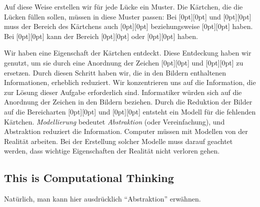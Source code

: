 \documentclass[a4paper,11pt]{report}
\newcommand{\taskGraphicsFolder}{..}
\begin{document}
Auf diese Weise erstellen wir für jede Lücke ein Muster. Die Kärtchen, die die Lücken füllen sollen, müssen in diese Muster passen: Bei \raisebox{-0.5ex}[0pt][0pt]{} und \raisebox{-0.5ex}[0pt][0pt]{} muss der Bereich des Kärtchens auch \raisebox{-0.5ex}[0pt][0pt]{} beziehungsweise \raisebox{-0.5ex}[0pt][0pt]{} haben. Bei \raisebox{-0.5ex}[0pt][0pt]{} kann der Bereich \raisebox{-0.5ex}[0pt][0pt]{} oder \raisebox{-0.5ex}[0pt][0pt]{} haben.

Wir haben eine Eigenschaft der Kärtchen entdeckt. Diese Entdeckung haben wir genutzt, um sie durch eine Anordnung der Zeichen \raisebox{-0.5ex}[0pt][0pt]{} und \raisebox{-0.5ex}[0pt][0pt]{} zu ersetzen. Durch diesen Schritt haben wir, die in den Bildern enthaltenen Informationen, erheblich reduziert. Wir konzentrieren uns auf die Information, die zur Lösung dieser Aufgabe erforderlich sind. Informatiker würden sich auf die Anordnung der Zeichen in den Bildern beziehen. Durch die Reduktion der Bilder auf die Bereicharten \raisebox{-0.5ex}[0pt][0pt]{} und \raisebox{-0.5ex}[0pt][0pt]{} entsteht ein Modell für die fehlenden Kärtchen. \emph{Modellierung} bedeutet \emph{Abstraktion} (oder Vereinfachung), und Abstraktion reduziert die Information. Computer müssen mit Modellen von der Realität arbeiten. Bei der Erstellung solcher Modelle muss darauf geachtet werden, dass wichtige Eigenschaften der Realität nicht verloren gehen.


\subsection*{This is Computational Thinking}

Natürlich, man kann hier ausdrücklich \enquote{Abstraktion} erwähnen.
\end{document}
